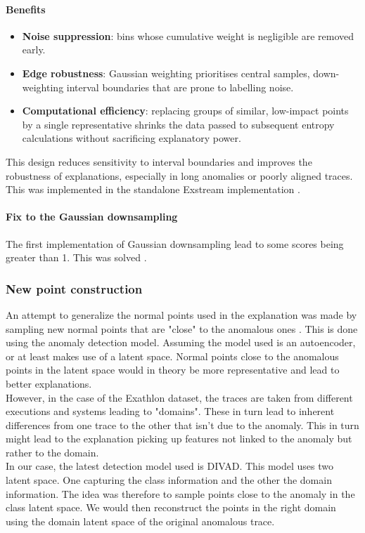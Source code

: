 \documentclass[11pt]{article}
\begin{document}
\paragraph{Benefits}
\begin{itemize}
  \item \textbf{Noise suppression}: bins whose cumulative weight is
        negligible are removed early.
  \item \textbf{Edge robustness}: Gaussian weighting prioritises
        central samples, down-weighting interval boundaries that are
        prone to labelling noise.
  \item \textbf{Computational efficiency}: replacing groups of similar,
        low-impact points by a single representative shrinks the data
        passed to subsequent entropy calculations without sacrificing
        explanatory power.
\end{itemize}


This design reduces sensitivity to interval boundaries and improves the robustness of explanations, especially in long anomalies or poorly aligned traces.
This was implemented in the standalone Exstream implementation \cite{exathlon-explanation}.


\paragraph{Fix to the Gaussian downsampling}
The first implementation \cite{Mija_thesis} of Gaussian downsampling lead to some scores being greater than 1. This was solved \cite{martineau2024exstream}.



\subsubsection{New point construction}
An attempt to generalize the normal points used in the explanation was made by sampling new normal points that are "close" to the anomalous ones \cite{Remi_thesis}. This is done using the anomaly detection model. Assuming the model used is an autoencoder, or at least makes use of a latent space. Normal points close to the anomalous points in the latent space would in theory be more representative and lead to better explanations.\\
However, in the case of the Exathlon dataset, the traces are taken from different executions and systems leading to "domains". These in turn lead to inherent differences from one trace to the other that isn't due to the anomaly. This in turn might lead to the explanation picking up features not linked to the anomaly but rather to the domain. \\
In our case, the latest detection model used is DIVAD. This model uses two latent space. One capturing the class information and the other the domain information. The idea was therefore to sample points close to the anomaly in the class latent space. We would then reconstruct the points in the right domain using the domain latent space of the original anomalous trace.
\end{document}
